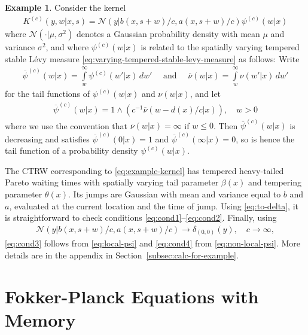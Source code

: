 \documentclass[a4paper,12pt]{elsarticle}
\numberwithin{equation}{section}
\theoremstyle{plain}
\theoremstyle{definition}
\newtheorem{example}[theorem]{Example}
\theoremstyle{remark}
\numberwithin{equation}{section}
\newcommand{\1}{\mathbf 1}
\begin{document}
\begin{example} \label{example}
Consider the kernel 
\begin{align}
\label{eq:example-kernel}
K^{(c)}(y,w|x,s) 
= \mathcal N\left(y | b(x,s+w)/c, a(x,s+w)/c\right)
\psi^{(c)}(w|x)
\end{align}
where $\mathcal N( \cdot | \mu, \sigma^2)$ denotes a Gaussian probability density with 
mean $\mu$ and variance $\sigma^2$, and where $\psi^{(c)}(w|x)$ is related to 
the spatially varying tempered stable L\'evy measure
\eqref{eq:varying-tempered-stable-levy-measure} as follows: 
Write 
\begin{align}
\overline \psi^{(c)}(w|x) = \int\limits_w^\infty \psi^{(c)}(w'|x)\,dw' 
\quad \text{ and } \quad 
\overline \nu(w|x) = \int\limits_w^\infty \nu(w'|x)\,dw'
\end{align}
for the tail functions of $\psi^{(c)}(w|x)$ and $\nu(w|x)$, and let 
\begin{align} \label{eq:def-psi}
\overline \psi^{(c)}(w|x) = 1 \wedge \left( c^{-1} \overline \nu(w-d(x)/c|x)\right), \quad w > 0
\end{align}
where we use the convention that $\overline \nu(w|x) = \infty$ if $w \le 0$. 
Then $\overline \psi^{(c)}(w|x)$ is decreasing and satisfies $\overline \psi^{(c)}(0|x) = 1$ and $\overline \psi^{(c)}(\infty|x) = 0$, so is hence the tail function of a probability density $\psi^{(c)}(w|x)$. 

The CTRW corresponding to \eqref{eq:example-kernel} has tempered heavy-tailed Pareto waiting times with spatially varying tail parameter $\beta(x)$ and tempering parameter $\theta(x)$. Its jumps are Gaussian with mean and variance equal to $b$ and $a$, evaluated at the current location and the time of jump. 
Using \eqref{eq:to-delta}, it is straightforward to check conditions \eqref{eq:cond1}--\eqref{eq:cond2}. 
Finally, using 
\begin{align}
\mathcal N\left(y | b(x,s+w)/c, a(x,s+w)/c\right) \to \delta_{(0,0)}(y), 
\quad c \to \infty,
\end{align}
\eqref{eq:cond3} follows from \eqref{eq:local-psi} and 
\eqref{eq:cond4} from \eqref{eq:non-local-psi}.
More details are in the appendix in Section~\ref{subsec:calc-for-example}.
\end{example}



\section{Fokker-Planck Equations with Memory}
\label{sec:FFPE}
\end{document}
